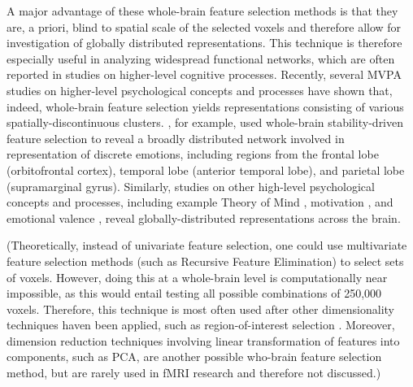 \documentclass[jou,12pt,a4paper]{apa6}
\begin{document}
A major advantage of these whole-brain feature selection methods is that they are, a priori, blind to spatial scale of the selected voxels and therefore allow for investigation of globally distributed representations. This technique is therefore especially useful in analyzing widespread functional networks, which are often reported in studies on higher-level cognitive processes. Recently, several MVPA studies on higher-level psychological concepts and processes have shown that, indeed, whole-brain feature selection yields representations consisting of various spatially-discontinuous clusters. , for example, used whole-brain stability-driven feature selection to reveal a broadly distributed network involved in representation of discrete emotions, including regions from the frontal lobe (orbitofrontal cortex), temporal lobe (anterior temporal lobe), and parietal lobe (supramarginal gyrus). Similarly, studies on other high-level psychological concepts and processes, including example Theory of Mind \cite{corradi2014}, motivation \cite{etzel2015}, and emotional valence \cite{baucom2012}, reveal globally-distributed representations across the brain. 

(Theoretically, instead of univariate feature selection, one could use multivariate feature selection methods (such as Recursive Feature Elimination) to select sets of voxels. However, doing this at a whole-brain level is computationally near impossible, as this would entail testing all possible combinations of 250,000 voxels. Therefore, this technique is most often used after other dimensionality techniques haven been applied, such as region-of-interest selection \cite{norman2006}. Moreover, dimension reduction techniques involving linear transformation of features into components, such as PCA, are another possible who-brain feature selection method, but are rarely used in fMRI research and therefore not discussed.)
\end{document}
